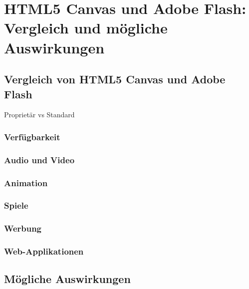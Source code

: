 

\chapter{HTML5 Canvas und Adobe Flash: Vergleich und mögliche Auswirkungen}

\section{Vergleich von HTML5 Canvas und Adobe Flash}
Proprietär vs Standard
\subsection{Verfügbarkeit}
\subsection{Audio und Video}
\subsection{Animation}
\subsection{Spiele}
\subsection{Werbung}
\subsection{Web-Applikationen}

\section{Mögliche Auswirkungen}
